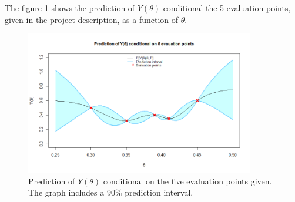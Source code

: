 The figure \ref{2afiveeval} shows the prediction of $Y(\theta)$ conditional the 5 evaluation points, given in the project description, as a function of $\theta$. 

\begin{figure}
    \centering
    \includegraphics[width=100mm]{2aPlot.png}
    \caption{Prediction of $Y(\theta)$ conditional on the five evaluation points given. The graph includes a $90\%$ prediction interval. }
    \label{2afiveeval}
\end{figure}

